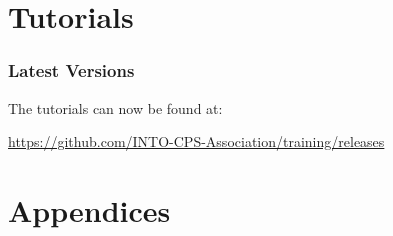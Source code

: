 \documentclass[narrowmargin,final,12pt,a4paper]{include/intocpsassociation}   %
\begin{document}
\part{Tutorials}
\label{part:tutorials}

\section*{Latest Versions}

The tutorials can now be found at:

\url{https://github.com/INTO-CPS-Association/training/releases}

%
%
%
%
%
%
%
%
%
%
%
%
%
%
%


\part{Appendices}
\appendix

\newpage


%
\end{document}
